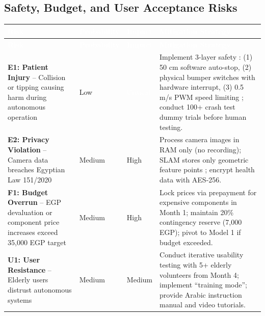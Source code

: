 \documentclass[12pt,a4paper]{report}
\renewcommand{\arraystretch}{1.45}
\renewcommand{\arraystretch}{1.3}
\begin{document}
\subsection{Safety, Budget, and User Acceptance Risks}
\label{tab:safety_risks}
{\renewcommand{\arraystretch}{2.0}
\begin{longtable}{@{}p{3cm}p{2cm}p{1.5cm}p{\dimexpr\textwidth-3cm-2cm-1.5cm-6\tabcolsep}@{}}
\toprule
\rowcolor{riskheader}
\textcolor{white}{\textbf{Risk}} & \textcolor{white}{\textbf{Probability}} & \textcolor{white}{\textbf{Impact}} & \textcolor{white}{\textbf{Mitigation Strategy}} \\
\midrule
\endfirsthead
\toprule
\rowcolor{riskheader}
\textcolor{white}{\textbf{Risk}} & \textcolor{white}{\textbf{Probability}} & \textcolor{white}{\textbf{Impact}} & \textcolor{white}{\textbf{Mitigation Strategy}} \\
\midrule
\endhead
\bottomrule
\endfoot
\rowcolor{lightgray}
\textbf{E1: Patient Injury} -- Collision or tipping causing harm during autonomous operation &
\cellcolor{lowgreen}Low & \cellcolor{criticalred}\textcolor{white}{Critical} &
Implement 3-layer safety \cite{iso13482}: (1) 50 cm software auto-stop, (2) physical bumper switches with hardware interrupt, (3) 0.5 m/s PWM speed limiting \cite{iso7176_6}; conduct 100+ crash test dummy trials before human testing. \\
\midrule
\textbf{E2: Privacy Violation} -- Camera data breaches Egyptian Law 151/2020 \cite{egypt_law_151} &
\cellcolor{mediumyellow}Medium & \cellcolor{highpink}High &
Process camera images in RAM only (no recording); SLAM stores only geometric feature points \cite{orbslam3}; encrypt health data with AES-256. \\
\midrule
\rowcolor{lightgray}
\textbf{F1: Budget Overrun} -- EGP devaluation or component price increases exceed 35,000 EGP target &
\cellcolor{mediumyellow}Medium & \cellcolor{highpink}High &
Lock prices via prepayment for expensive components in Month 1; maintain 20\% contingency reserve (7,000 EGP); pivot to Model 1 if budget exceeded. \\
\midrule
\textbf{U1: User Resistance} -- Elderly users distrust autonomous systems &
\cellcolor{mediumyellow}Medium & \cellcolor{mediumyellow}Medium &
Conduct iterative usability testing with 5+ elderly volunteers from Month 4; implement ``training mode''; provide Arabic instruction manual and video tutorials. \\
\end{longtable}}
\end{document}

